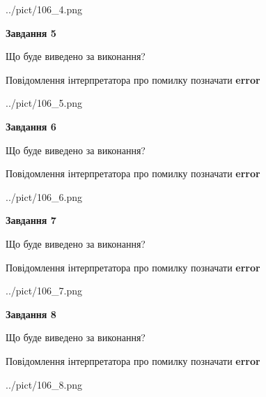 \documentclass[12pt, ukrainian]{article}
\begin{document}
{\begin{center}
	{../pict/106_4.png}
\end{center}
\newpage

{\begin {center}\textbf{Завдання 5}\end {center}}\par
Що буде виведено за виконання? \par
Повідомлення інтерпретатора про помилку позначати \textbf{error}

\begin{center}
	{../pict/106_5.png}
\end{center}
\newpage

{\begin {center}\textbf{Завдання 6}\end {center}}\par
Що буде виведено за виконання? \par
Повідомлення інтерпретатора про помилку позначати \textbf{error}

\begin{center}
	{../pict/106_6.png}
\end{center}
\newpage

{\begin {center}\textbf{Завдання 7}\end {center}}\par
Що буде виведено за виконання? \par
Повідомлення інтерпретатора про помилку позначати \textbf{error}

\begin{center}
	{../pict/106_7.png}
\end{center}
\newpage

{\begin {center}\textbf{Завдання 8}\end {center}}\par
Що буде виведено за виконання? \par
Повідомлення інтерпретатора про помилку позначати \textbf{error}

\begin{center}
	{../pict/106_8.png}
\end{center}
\newpage

}
\end{document}
